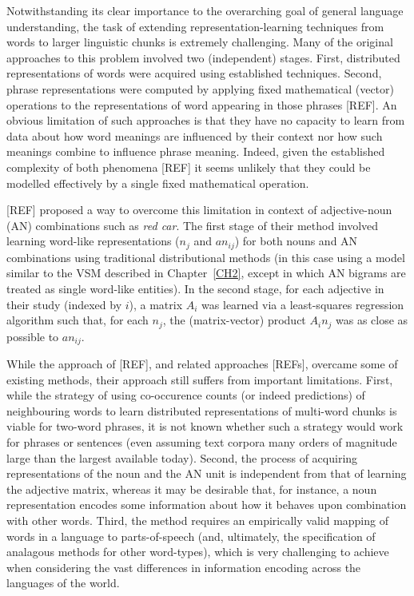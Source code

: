 \label{CH4}

Notwithstanding its clear importance to the overarching goal of general language understanding, the task of extending representation-learning techniques from words to larger linguistic chunks is extremely challenging. Many of the original approaches to this problem involved two (independent) stages. First, distributed representations of words were acquired using established techniques. Second, phrase representations were computed by applying fixed mathematical (vector) operations to the representations of word appearing in those phrases [REF]. An obvious limitation of such approaches is that they have no capacity to learn from data about how word meanings are influenced by their context nor how such meanings combine to influence phrase meaning. Indeed, given the established complexity of both phenomena [REF] it seems unlikely that they could be modelled effectively by a single fixed mathematical operation.  

[REF] proposed a way to overcome this limitation in context of adjective-noun (AN) combinations such as \emph{red car}. The first stage of their method involved learning word-like representations (\(n_j\) and \(an_{ij}\)) for both nouns and AN combinations using traditional distributional methods (in this case using a model similar to the VSM described in Chapter~\ref{CH2}, except in which AN bigrams are treated as single word-like entities). In the second stage, for each adjective in their study (indexed by \(i\)), a matrix \(A_i\) was learned via a least-squares regression algorithm such that, for each \(n_j\), the (matrix-vector) product \(A_i n_j\) was as close as possible to \(an_{ij}\).

While the approach of [REF], and related approaches [REFs], overcame some of existing methods, their approach still suffers from important limitations. First, while the strategy of using co-occurence counts (or indeed predictions) of neighbouring words to learn distributed representations of multi-word chunks is viable for two-word phrases, it is not known whether such a strategy would work for phrases or sentences (even assuming text corpora many orders of magnitude large than the largest available today). Second, the process of acquiring representations of the noun and the AN unit is independent from that of learning the adjective matrix, whereas it may be desirable that, for instance, a noun representation encodes some information about how it behaves upon combination with other words. Third, the method requires an empirically valid mapping of words in a language to parts-of-speech (and, ultimately, the specification of analagous methods for other word-types), which is very challenging to achieve when considering the vast differences in information encoding across the languages of the world. 


